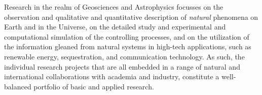 Research in the realm of Geosciences and Astrophysics focusses on the
observation and qualitative and quantitative description of
\textit{natural} phenomena on Earth and in the Universe, on the
detailed study and experimental and computational simulation of the
controlling processes, and on the utilization of the information
gleaned from natural systems in high-tech applications, such as
renewable energy,  sequestration, and communication
technology. As such, the individual research projects that are all
embedded in a range of natural and international collaborations with
academia and industry, constitute a well-balanced portfolio of basic
and applied research.
